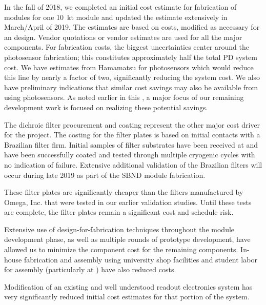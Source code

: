 In the fall of 2018, we completed an initial cost estimate for fabrication of  modules for one \SI{10}{kt}  module and updated the estimate extensively in March/April of 2019.  The estimates are based on  costs, modified as necessary for an  design.  Vendor quotations or vendor estimates are used for all the major components. %
For fabrication costs, the biggest uncertainties center around the photosensor fabrication; this constitutes approximately half the total PD system cost.
We have estimates from Hamamatsu for photosensors which would reduce this line by nearly a factor of two, significantly reducing the system cost.  We also have preliminary indications that similar cost savings may also be available from using  photosensors.  As noted earlier in this , a major focus of our remaining development work is focused on realizing these potential savings.

The dichroic filter procurement and coating represent the other major cost driver for the project.  The costing for the filter plates is based on initial contacts with a Brazilian filter firm.  Initial samples of filter substrates have been received at  and have been successfully coated and tested through multiple cryogenic cycles with no indication of failure. Extensive additional validation of the Brazilian filters  will occur during late 2019 as part of the SBND module fabrication.

These filter plates are significantly cheaper than the filters manufactured by Omega, Inc. that were tested in our earlier validation studies.  Until these tests are complete, the filter plates remain a significant cost and schedule risk.

Extensive use of design-for-fabrication techniques throughout the module development phase, as well as multiple rounds of prototype development, have allowed us to minimize the component cost for the remaining components.  In-house fabrication and assembly using university shop facilities and student labor for assembly (particularly at ) have also reduced costs.

Modification of an existing and well understood readout electronics system has very significantly reduced initial cost estimates for that portion of the system.
